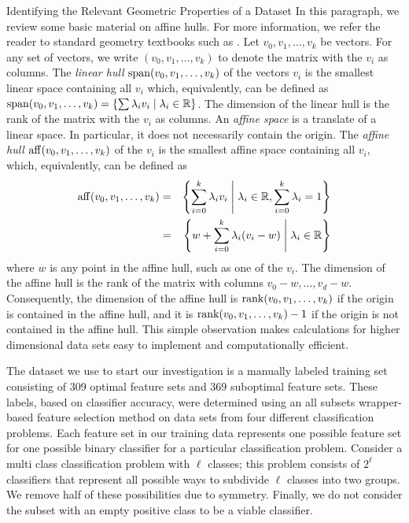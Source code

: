 \documentclass{llncs}
\begin{document}
\begin{section}{Identifying the Relevant Geometric Properties of a Dataset}
In this paragraph, we review some basic material on affine hulls. For more information, we refer the reader to standard geometry textbooks such as \cite{webster}. Let $v_0,v_1,\dots, v_k$ be vectors. For any set of vectors, we write $(v_0,v_1,\dots,v_k)$ to denote the matrix with the $v_i$ as columns. The {\em linear hull} $\operatorname{span}(v_0,v_1,\dots,v_k)$ of the vectors $v_i$ is the smallest linear space  containing all $v_i$ which, equivalently, can be defined as $\operatorname{span}(v_0,v_1,\dots,v_k) = \left\{ \sum \lambda_iv_i \;\middle| \; \lambda_i \in \mathbb{R} \right\}$.
The dimension of the linear hull is the rank of the matrix with the $v_i$ as columns. An {\em affine space} is a translate of a linear space. In particular, it does not necessarily contain the origin. The {\em affine hull} $\operatorname{aff}(v_0,v_1,\dots,v_k)$ of the $v_i$ is the smallest affine space containing all $v_i$, which, equivalently, can be defined as
\begin{eqnarray*}
\operatorname{aff}(v_0,v_1,\dots,v_k) &=& \left\{ \sum_{i=0}^k\lambda_iv_i \;\middle| \; \lambda_i\in \mathbb{R}, \sum_{i=0}^k\lambda_i = 1 \right\} \\
&=& \left\{ w +\sum_{i=0}^k\lambda_i(v_i-w) \;\middle| \; \lambda_i\in \mathbb{R} \right\}
\end{eqnarray*}
where $w$ is any point in the affine hull, such as one of the $v_i$. The dimension of the affine hull is the rank of the matrix with columns $v_0-w, \ldots, v_d-w$. Consequently, the dimension of the affine hull is $\operatorname{rank}(v_0,v_1,\dots,v_k)$ if the origin is contained in the affine hull, and it is $\operatorname{rank}(v_0,v_1,\dots,v_k)-1$ if the origin is not contained in the affine hull. This simple observation makes calculations for higher dimensional data sets easy to implement and computationally efficient.


The dataset we use to start our investigation is a manually labeled training set consisting of 309 optimal feature sets and 369 suboptimal feature sets. These labels, based on classifier accuracy, were determined using an all subsets wrapper-based feature selection method on data sets from four different classification problems. Each feature set in our training data represents one possible feature set for one possible binary classifier for a particular classification problem. Consider a multi class classification problem with $\ell$ classes; this problem consists of $2^{\ell}$ classifiers that represent all possible ways to subdivide $\ell$ classes into two groups. We remove half of these possibilities due to symmetry. Finally, we do not consider the subset with an empty positive class to be a viable classifier. 


\end{section}
\end{document}
